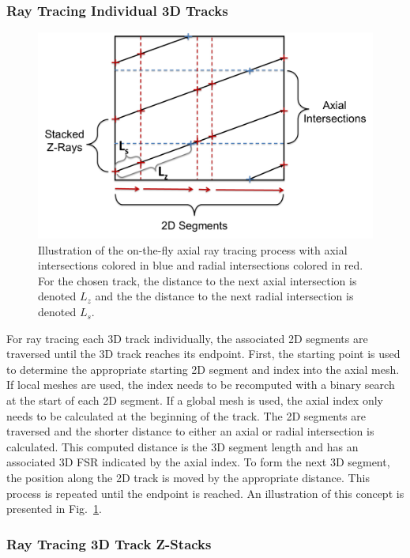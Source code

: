\subsubsection{Ray Tracing Individual 3D Tracks}


\begin{figure}[ht!]
	\centering
	\includegraphics[width=0.75\linewidth]{figures/ph2016/otf_ray_tracing.png}
	\caption{Illustration of the on-the-fly axial ray tracing process with axial intersections colored in blue and radial intersections colored in red. For the chosen track, the distance to the next axial intersection is denoted $L_z$ and the the distance to the next radial intersection is denoted $L_s$.}
	\label{fig::otf_ray_tracing}
\end{figure}



For ray tracing each 3D track individually, the associated 2D segments are traversed until the 3D track reaches its endpoint. First, the starting point is used to determine the appropriate starting 2D segment and index into the axial mesh. If local meshes are used, the index needs to be recomputed with a binary search at the start of each 2D segment. If a global mesh is used, the axial index only needs to be calculated at the beginning of the track. The 2D segments are traversed and the shorter distance to either an axial or radial intersection is calculated. This computed distance is the 3D segment length and has an associated 3D FSR indicated by the axial index. To form the next 3D segment, the position along the 2D track is moved by the appropriate distance. This process is repeated until the endpoint is reached. An illustration of this concept is presented in Fig.~\ref{fig::otf_ray_tracing}.

\subsubsection{Ray Tracing 3D Track Z-Stacks}


